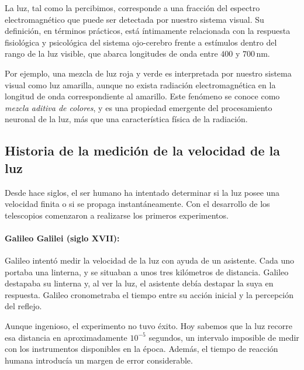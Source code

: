 La luz, tal como la percibimos, corresponde a una fracción del espectro electromagnético que puede ser detectada por nuestro sistema visual. Su definición, en términos prácticos, está íntimamente relacionada con la respuesta fisiológica y psicológica del sistema ojo-cerebro frente a estímulos dentro del rango de la luz visible, que abarca longitudes de onda entre $400$ y $700\,\mathrm{nm}$.

Por ejemplo, una mezcla de luz roja y verde es interpretada por nuestro sistema visual como luz amarilla, aunque no exista radiación electromagnética en la longitud de onda correspondiente al amarillo. Este fenómeno se conoce como \textit{mezcla aditiva de colores}, y es una propiedad emergente del procesamiento neuronal de la luz, más que una característica física de la radiación.

\vspace{0.3cm}

\subsection*{Historia de la medición de la velocidad de la luz}

Desde hace siglos, el ser humano ha intentado determinar si la luz posee una velocidad finita o si se propaga instantáneamente. Con el desarrollo de los telescopios comenzaron a realizarse los primeros experimentos.

\paragraph{Galileo Galilei (siglo XVII):} Galileo intentó medir la velocidad de la luz con ayuda de un asistente. Cada uno portaba una linterna, y se situaban a unos tres kilómetros de distancia. Galileo destapaba su linterna y, al ver la luz, el asistente debía destapar la suya en respuesta. Galileo cronometraba el tiempo entre su acción inicial y la percepción del reflejo.

Aunque ingenioso, el experimento no tuvo éxito. Hoy sabemos que la luz recorre esa distancia en aproximadamente $10^{-5}$ segundos, un intervalo imposible de medir con los instrumentos disponibles en la época. Además, el tiempo de reacción humana introducía un margen de error considerable.

\vspace{0.3cm}

